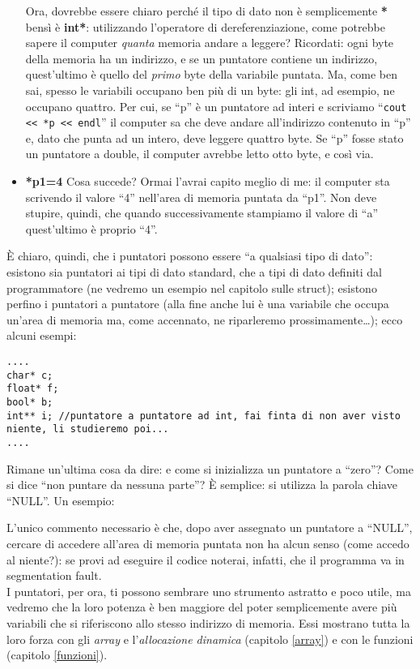 \begin{itemize}
		Ora, dovrebbe essere chiaro perché il tipo di dato non è semplicemente \textbf{*} bensì è \textbf{int*}: utilizzando l'operatore di dereferenziazione, come potrebbe sapere il computer \emph{quanta} memoria andare a leggere? Ricordati: ogni byte della memoria ha un indirizzo, e se un puntatore contiene un indirizzo, quest'ultimo è quello del \emph{primo} byte della variabile puntata. Ma, come ben sai, spesso le variabili occupano ben più di un byte: gli int, ad esempio, ne occupano quattro. Per cui, se ``p'' è un puntatore ad interi e scriviamo ``\lstinline|cout << *p << endl|'' il computer sa che deve andare all'indirizzo contenuto in ``p'' e, dato che punta ad un intero, deve leggere quattro byte. Se ``p'' fosse stato un puntatore a double, il computer avrebbe letto otto byte, e così via. 
		
		\item \textbf{*p1=4} Cosa succede? Ormai l'avrai capito meglio di me: il computer sta scrivendo il valore ``4'' nell'area di memoria puntata da ``p1''. Non deve stupire, quindi, che quando successivamente stampiamo il valore di ``a'' quest'ultimo è proprio  ``4''.
	\end{itemize}
	
	È chiaro, quindi, che i puntatori possono essere ``a qualsiasi tipo di dato'': esistono sia puntatori ai tipi di dato standard, che a tipi di dato definiti dal programmatore (ne vedremo un esempio nel capitolo sulle struct); esistono perfino i puntatori a puntatore (alla fine anche lui è una variabile che occupa un'area di memoria ma, come accennato, ne riparleremo prossimamente\ldots); ecco alcuni esempi:
	\begin{lstlisting}
....
char* c;
float* f;
bool* b;
int** i; //puntatore a puntatore ad int, fai finta di non aver visto niente, li studieremo poi...
....
	\end{lstlisting}
	
	Rimane un'ultima cosa da dire: e come si inizializza un puntatore a ``zero''? Come si dice ``non puntare da nessuna parte''? È semplice: si utilizza la parola chiave ``NULL''. Un esempio:
	
	
	L'unico commento necessario è che, dopo aver assegnato un puntatore a ``NULL'', cercare di accedere all'area di memoria puntata non ha alcun senso (come accedo al niente?): se provi ad eseguire il codice noterai, infatti, che il programma va in segmentation fault.\\

	I puntatori, per ora, ti possono sembrare uno strumento astratto e poco utile,  ma vedremo che la loro potenza è ben maggiore del poter semplicemente avere più variabili che si riferiscono allo stesso indirizzo di memoria. Essi mostrano tutta la loro forza con gli \emph{array} e l'\emph{allocazione dinamica} (capitolo \ref{array}) e con le funzioni (capitolo \ref{funzioni}). 